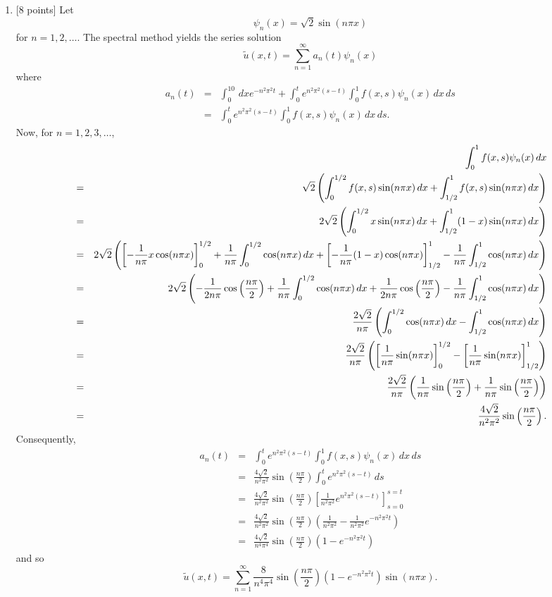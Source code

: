  \begin{solution}

\begin{enumerate}
\item {[8 points]} Let
\[
\psi_n(x) = \sqrt{2} \sin\left(n\pi x\right)
\]
for $n=1,2,\ldots$. The spectral method yields the series solution
\[
\tilde{u}(x,t)=\sum_{n=1}^\infty a_n(t)\psi_n(x)
\]
where
\begin{eqnarray*}
a_n(t)&=&\int_0^10\,dx e^{-n^2\pi^2t}+\int_0^te^{n^2\pi^2\left(s-t\right)}\int_0^1f(x,s)\psi_n(x)\,dx\,ds
\\
&=&\int_0^te^{n^2\pi^2\left(s-t\right)}\int_0^1f(x,s)\psi_n(x)\,dx\,ds.
\end{eqnarray*}
Now, for $n=1,2,3,\ldots$,
\begin{eqnarray*}
&&\int_0^1f(x,s)\psi_n(x)\,dx 
\\
&=& \sqrt{2}\left(\int_0^{1/2} f(x,s)\sin(n\pi x)\,dx+\int_{1/2}^1 f(x,s)\sin(n\pi x)\,dx\right)
\\
&=& 2\sqrt{2}\left(\int_0^{1/2} x\sin(n\pi x)\,dx+\int_{1/2}^1 (1-x)\sin(n\pi x)\,dx\right)
\\
&=&2\sqrt{2}\left(\left[-{1 \over n\pi}x\cos(n\pi x)\right]_0^{1/2}+{1 \over n\pi}\int_0^{1/2} \cos(n\pi x)\,dx+\left[-{1 \over n\pi}(1-x)\cos(n\pi x)\right]_{1/2}^1-{1 \over n\pi}\int_{1/2}^1 \cos(n\pi x)\,dx\right)
\\
&=&2\sqrt{2}\left(-{1 \over 2n\pi}\cos\left({n\pi \over 2}\right)+{1 \over n\pi}\int_0^{1/2} \cos(n\pi x)\,dx+{1 \over 2n\pi}\cos\left({n\pi \over 2}\right)-{1 \over n\pi}\int_{1/2}^1 \cos(n\pi x)\,dx\right)
\\
&=&\frac{2\sqrt{2}}{n\pi}\left(\int_0^{1/2} \cos(n\pi x)\,dx-\int_{1/2}^1 \cos(n\pi x)\,dx\right)
\\
&=&\frac{2\sqrt{2}}{n\pi}\left(\left[{1 \over n\pi}\sin(n\pi x)\right]_0^{1/2}-\left[{1 \over n\pi}\sin(n\pi x)\right]_{1/2}^1\right)
\\
&=&\frac{2\sqrt{2}}{n\pi}\left({1 \over n\pi}\sin\left(\frac{n\pi}{2}\right)+{1 \over n\pi}\sin\left(\frac{n\pi}{2}\right)\right)
\\
&=&\frac{4\sqrt{2}}{n^2\pi^2}\sin\left(\frac{n\pi}{2}\right).
\end{eqnarray*}
Consequently,
\begin{eqnarray*}
a_n(t)&=&\int_0^te^{n^2\pi^2\left(s-t\right)}\int_0^1f(x,s)\psi_n(x)\,dx\,ds
\\
&=&\frac{4\sqrt{2}}{n^2\pi^2}\sin\left(\frac{n\pi}{2}\right)\int_0^te^{n^2\pi^2\left(s-t\right)}\,ds
\\
&=&\frac{4\sqrt{2}}{n^2\pi^2}\sin\left(\frac{n\pi}{2}\right)\left[\frac{1}{n^2\pi^2}e^{n^2\pi^2\left(s-t\right)}\right]_{s=0}^{s=t}
\\
&=&\frac{4\sqrt{2}}{n^2\pi^2}\sin\left(\frac{n\pi}{2}\right)\left(\frac{1}{n^2\pi^2}-\frac{1}{n^2\pi^2}e^{-n^2\pi^2t}\right)
\\
&=&\frac{4\sqrt{2}}{n^4\pi^4}\sin\left(\frac{n\pi}{2}\right)\left(1-e^{-n^2\pi^2t}\right)
\end{eqnarray*}
and so
\[
\tilde{u}(x,t)=\sum_{n=1}^\infty\frac{8}{n^4\pi^4}\sin\left(\frac{n\pi}{2}\right)\left(1-e^{-n^2\pi^2t}\right)\sin(n\pi x).
\]


\end{enumerate}
\end{solution}
